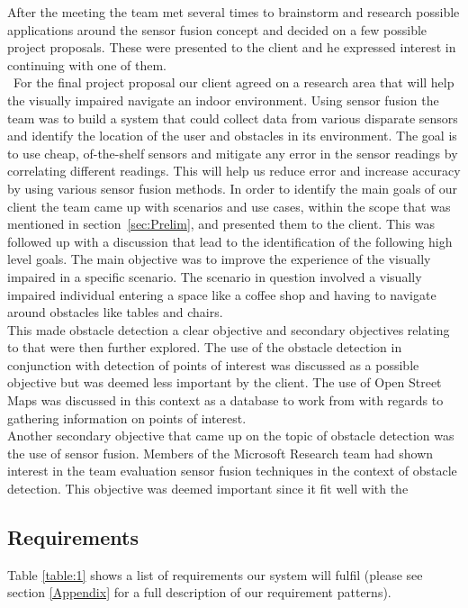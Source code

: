 \documentclass[prodmode,acmtosem]{acmsmall} %
\begin{document}
After the meeting the team met several times to brainstorm and research possible applications around the sensor fusion concept and decided on a few possible project proposals.
These were presented to the client and he expressed interest in continuing with one of them.\\\
For the final project proposal our client agreed on a research area that will help the visually impaired navigate an indoor environment.
Using sensor fusion the team was to build a system that could collect data from various disparate sensors and identify the location of the user and obstacles in its environment.
The goal is to use cheap, of-the-shelf sensors and mitigate any error in the sensor readings by correlating different readings. This will help us reduce error and increase accuracy by using various sensor fusion methods.
In order to identify the main goals of our client the team came up with scenarios and use cases, within the scope that was mentioned in section~\ref{sec:Prelim}, and presented them to the client. This was followed up with a discussion that lead to the identification of the following high level goals.
The main objective was to improve the experience of the visually impaired in a specific scenario. The scenario in question involved a visually impaired individual entering a space like a coffee shop and having to navigate around obstacles like tables and chairs.\\
This made obstacle detection a clear objective and secondary objectives relating to that were then further explored. The use of the obstacle detection in conjunction with detection of points of interest was discussed as a possible objective but was deemed less important by the client.
The use of Open Street Maps
was discussed in this context as a database to work from with regards to gathering information on points of interest.\\ Another secondary objective that came up on the topic of obstacle detection was the use of sensor fusion. Members of the Microsoft Research team had shown interest in the team evaluation sensor fusion techniques in the context of obstacle detection. This objective was deemed important since it fit well with the 

\subsection{Requirements}

Table \ref{table:1} shows a list of requirements our system will fulfil (please see section \ref{Appendix} for a full description of our requirement patterns).\\
\end{document}
